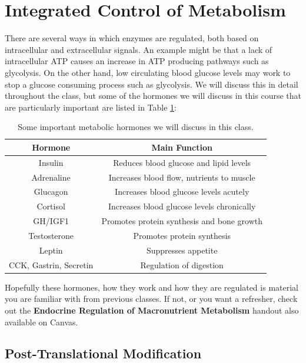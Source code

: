 \documentclass{tufte-handout}
\begin{document}
\section{Integrated Control of Metabolism}

There are several ways in which enzymes are regulated, both based on intracellular and extracellular signals.  An example might be that a lack of intracellular ATP causes an increase in ATP producing pathways such as glycolysis.  On the other hand, low circulating blood glucose levels may work to stop a glucose consuming process such as glycolysis.  We will discuss this in detail throughout the class, but some of the hormones we will discuss in this course that are particularly important are listed in Table \ref{tab:hormones}:

\begin{table}[h]
\centering
\caption{Some important metabolic hormones we will discuss in this class.}
\label{tab:hormones}
\begin{tabular}{cc}
\hline
\textbf{Hormone}       & \textbf{Main Function}                     \\
\hline
Insulin                & Reduces blood glucose and lipid levels     \\
Adrenaline        & Increases blood flow, nutrients to muscle \\
Glucagon               & Increases blood glucose levels acutely     \\
Cortisol               & Increases blood glucose levels chronically \\
GH/IGF1                & Promotes protein synthesis and bone growth \\
Testosterone           & Promotes protein synthesis                 \\
Leptin                 & Suppresses appetite                        \\
CCK, Gastrin, Secretin & Regulation of digestion                   \\
\hline
\end{tabular}
\end{table}


Hopefully these hormones, how they work and how they are regulated is material you are familiar with from previous classes.  If not, or you want a refresher, check out the \textbf{Endocrine Regulation of Macronutrient Metabolism} handout also available on Canvas.  

\subsection{Post-Translational Modification}
\end{document}
